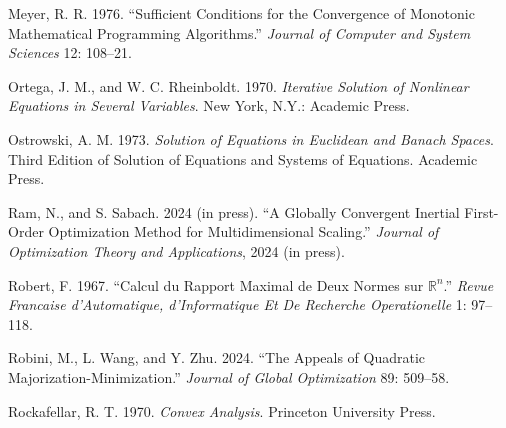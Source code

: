 \documentclass[
  12pt,
]{article}
\newlength{\cslhangindent}
\newenvironment{CSLReferences}[2] %
 {\begin{list}{}{%
  \setlength{\itemindent}{0pt}
  \setlength{\leftmargin}{0pt}
  \setlength{\parsep}{0pt}
  \ifodd #1
   \setlength{\leftmargin}{\cslhangindent}
   \setlength{\itemindent}{-1\cslhangindent}
  \fi
  \setlength{\itemsep}{#2\baselineskip}}}
 {\end{list}}
\begin{document}
\begin{CSLReferences}{1}{0}
Meyer, R. R. 1976. {``{Sufficient Conditions for the Convergence of Monotonic Mathematical Programming Algorithms}.''} \emph{Journal of Computer and System Sciences} 12: 108--21.

Ortega, J. M., and W. C. Rheinboldt. 1970. \emph{{Iterative Solution of Nonlinear Equations in Several Variables}}. New York, N.Y.: Academic Press.

Ostrowski, A. M. 1973. \emph{Solution of Equations in Euclidean and Banach Spaces}. Third Edition of Solution of Equations and Systems of Equations. Academic Press.

Ram, N., and S. Sabach. 2024 (in press). {``A Globally Convergent Inertial First-Order Optimization Method for Multidimensional Scaling.''} \emph{Journal of Optimization Theory and Applications}, 2024 (in press).

Robert, F. 1967. {``{Calcul du Rapport Maximal de Deux Normes sur \(\mathbb{R}^n\)}.''} \emph{Revue Francaise d'Automatique, d'Informatique Et De Recherche Operationelle} 1: 97--118.

Robini, M., L. Wang, and Y. Zhu. 2024. {``The Appeals of Quadratic Majorization-Minimization.''} \emph{Journal of Global Optimization} 89: 509--58.

Rockafellar, R. T. 1970. \emph{Convex Analysis}. Princeton University Press.

\end{CSLReferences}
\end{document}

